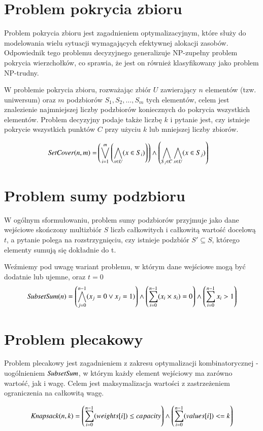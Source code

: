 \section{Problem pokrycia zbioru}
Problem pokrycia zbioru jest zagadnieniem optymalizacyjnym, które służy do modelowania wielu sytuacji wymagających efektywnej alokacji zasobów. Odpowiednik tego problemu decyzyjnego generalizuje NP-zupełny problem pokrycia wierzchołków, co sprawia, że jest on również klasyfikowany jako problem NP-trudny.

W problemie pokrycia zbioru, rozważając zbiór \(U\) zawierający \(n\) elementów (tzw. uniwersum) oraz \(m\) podzbiorów $S_1, S_2, …, S_m$ tych elementów, celem jest znalezienie najmniejszej liczby podzbiorów koniecznych do pokrycia wszystkich elementów. Problem decyzyjny podaje także liczbę \(k\) i pytanie jest, czy istnieje pokrycie wszystkich punktów \(C\) przy użyciu \(k\) lub mniejszej liczby zbiorów.

\begin{align*}
	{\mathit{SetCover}}(n, m) = &\left( \bigvee_{i=1}^{m} \left( \bigwedge_{x\in U} (x \in S_i) \right) \right) \land 
	\left( \bigwedge_{S_j\in C} \bigwedge_{x\in U} (x \in S_j) \right)
\end{align*}


\section{Problem sumy podzbioru}


W ogólnym sformułowaniu, problem sumy podzbiorów przyjmuje jako dane wejściowe skończony multizbiór \(S\) liczb całkowitych i całkowitą wartość docelową \(t\), a pytanie polega na rozstrzygnięciu, czy istnieje podzbiór $S' \subseteq S$, którego elementy sumują się dokładnie do t. 

Weźmiemy pod uwagę wariant problemu, w którym dane wejściowe mogą być dodatnie lub ujemne, oraz \(t = 0\)
\begin{align*}
	{\mathit{SubsetSum}}(n) = \left( \bigwedge_{j=0}^{n-1} (x_j = 0 \lor x_j = 1) \right) \land 
	\left( \sum_{i=0}^{n-1} (x_i \times s_i) = 0 \right) \land 
	\left( \sum_{i=0}^{n-1} x_i > 1 \right)
\end{align*}


\section{Problem plecakowy}
Problem plecakowy jest zagadnieniem z zakresu optymalizacji kombinatorycznej - uogólnieniem ${\mathit{SubsetSum}}$, w którym każdy element wejściowy ma zarówno wartość, jak i wagę. Celem jest maksymalizacja wartości z zastrzeżeniem ograniczenia na całkowitą wagę.

\begin{align*}
	{\mathit{Knapsack}}(n, k) = \left( \sum_{i=0}^{n-1} (weights[i]) \leq capacity \right) \land 
	\left( \sum_{i=0}^{n-1} (values[i]) <= k \right)
\end{align*}



